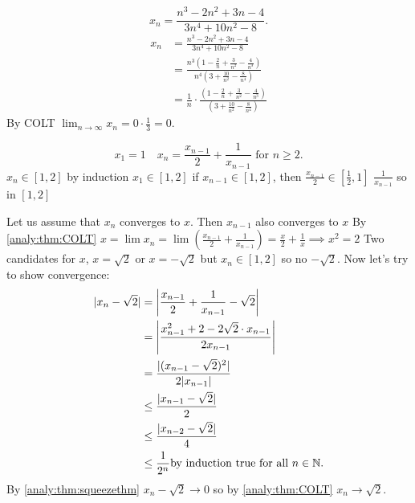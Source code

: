 \documentclass[10pt, a4paper]{article}
\begin{document}
\begin{example}
    \[
    x_n = \frac{n ^ 3 - 2n ^ 2 + 3n - 4}{3n ^ 4 + 10n ^ 2 - 8}.
    \]
    \begin{align*}
        x_n &= \frac{n ^ 3 - 2n ^ 2 + 3n - 4}{3n ^ 4 + 10n ^ 2 - 8} \\
        &= \frac{n ^ 3 \left(1 - \frac{2}{n} + \frac{3}{n ^ 2} - \frac{4}{n ^ 3}\right)}{n ^ 4 \left(3 + \frac{10}{n ^ 2} - \frac{8}{n ^ 4} \right)} \\
        &= \frac{1}{n} \cdot \frac{\left(1 - \frac{2}{n} + \frac{3}{n ^ 2} - \frac{4}{n ^ 3}\right)}{\left(3 + \frac{10}{n ^ 2} - \frac{8}{n ^ 4} \right)}
    \end{align*}
    By COLT $\lim_{n \rightarrow \infty}x_n = 0 \cdot \frac{1}{3} = 0$.
\end{example}

\begin{example}
    \[
    x_1 = 1\quad x_n = \frac{x_{n - 1}}{2} + \frac{1}{x_{n - 1}}\text{ for } n \geq 2.
    \]
    $x_n \in [1, 2]$ by induction $x_1 \in [1, 2]$
    if $x_{n - 1} \in [1, 2]$,
    then $\frac{x_{n - 1}}{2} \in \left[\frac{1}{2}, 1\right]$
    $\frac{1}{x_{n - 1}}$ so in $[1, 2]$

    Let us assume that $x_n$ converges to $x$.
    Then $x_{n - 1}$ also converges to $x$
    By \autoref{analy:thm:COLT} $x = \lim x_n = \lim \left(\frac{x_{n - 1}}{2} + \frac{1}{x_{n - 1}}\right) = \frac{x}{2} + \frac{1}{x} \implies x ^ 2 = 2$
    Two candidates for $x$,
    $x = \sqrt{2}$ or $x = -\sqrt{2}$ but $x_n \in [1, 2]$ so no $-\sqrt{2}$.
    Now let's try to show convergence:
    \begin{align*}
        |x_n - \sqrt{2}| &= \left|\frac{x_{n - 1}}{2} + \frac{1}{x_{n - 1}} - \sqrt{2}\right| \\
        &= \left|\frac{x_{n - 1} ^ 2 + 2 - 2\sqrt{2}\cdot x_{n - 1}}{2x_{n - 1}}\right| \\
        &= \frac{|(x_{n - 1} - \sqrt{2}) ^ 2|}{2|x_{n - 1}|} \\
        &\leq \frac{|x_{n - 1} - \sqrt{2}|}{2} \\
        &\leq \frac{|x_{n - 2} - \sqrt{2}|}{4} \\
        &\leq \frac{1}{2 ^ n} \text{by induction true for all } n \in \mathbb{N}.
    \end{align*}
    By \autoref{analy:thm:squeezethm} $x_n - \sqrt{2} \rightarrow 0$ so by \autoref{analy:thm:COLT}
    $x_n \rightarrow \sqrt{2}$.
\end{example}
\end{document}

